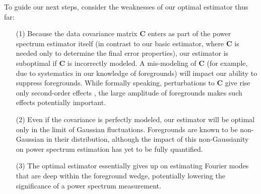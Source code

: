 \documentclass[twocolumn,aps,prd,nofootinbib,showpacs]{revtex4-1}
\begin{document}
To guide our next steps, consider the weaknesses of our optimal estimator thus far:
\begin{enumerate}
\item[(1)] Because the data covariance matrix $\mathbf{C}$ enters as part of the power spectrum estimator itself (in contrast to our basic estimator, where $\mathbf{C}$ is needed only to determine the final error properties), our estimator is suboptimal if $\mathbf{C}$ is incorrectly modeled.  A mis-modeling of $\mathbf{C}$ (for example, due to systematics in our knowledge of foregrounds) will impact our ability to suppress foregrounds.  While formally speaking, perturbations to $\mathbf{C}$ give rise only second-order effects \cite{Tegmark2001}, the large amplitude of foregrounds makes such effects potentially important.
\item[(2)] Even if the covariance is perfectly modeled, our estimator will be optimal only in the limit of Gaussian fluctuations.  Foregrounds are known to be non-Gaussian in their distribution, although the impact of this non-Gaussianity on power spectrum estimation has yet to be fully quantified.
\item[(3)] The optimal estimator essentially gives up on estimating Fourier modes that are deep within the foreground wedge, potentially lowering the significance of a power spectrum measurement.
\end{enumerate}
\end{document}
